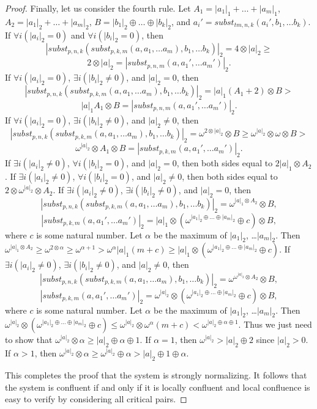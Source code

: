 \documentclass[reqno]{amsart}
\theoremstyle{definition}
\theoremstyle{remark}
\newcommand{\subst}{\mathit{subst}}
\newcommand{\tm}{\mathit{tm}}
\numberwithin{figure}{section}
\begin{document}
\begin{proof}
Finally, let us consider the fourth rule.
Let $A_1 = |a_1|_1 + \ldots + |a_m|_1$, $A_2 = |a_1|_2 + \ldots + |a_m|_2$, $B = |b_1|_2 \oplus \ldots \oplus |b_k|_2$, and $a_i' = \subst_{\tm,n,k}(a_i', b_1, \ldots b_k)$.
If $\forall i (|a_i|_2 = 0)$ and $\forall i (|b_i|_2 = 0)$, then
\[ |\subst_{p,n,k}(\subst_{p,k,m}(a, a_1, \ldots a_m), b_1, \ldots b_k)|_2 = 4 \otimes |a|_2 \geq \]
\[ 2 \otimes |a|_2 = |\subst_{p,n,m}(a, a_1', \ldots a_m')|_2. \]
If $\forall i (|a_i|_2 = 0)$, $\exists i (|b_i|_2 \neq 0)$, and $|a|_2 = 0$, then
\[ |\subst_{p,n,k}(\subst_{p,k,m}(a, a_1, \ldots a_m), b_1, \ldots b_k)|_2 = |a|_1 (A_1 + 2) \otimes B > \]
\[ |a|_1 A_1 \otimes B = |\subst_{p,n,m}(a, a_1', \ldots a_m')|_2. \]
If $\forall i (|a_i|_2 = 0)$, $\exists i (|b_i|_2 \neq 0)$, and $|a|_2 \neq 0$, then
\[ |\subst_{p,n,k}(\subst_{p,k,m}(a, a_1, \ldots a_m), b_1, \ldots b_k)|_2 = \omega^{2 \otimes |a|_2} \otimes B \geq \omega^{|a|_2} \otimes \omega \otimes B >  \]
\[ \omega^{|a|_2} \otimes A_1 \otimes B = |\subst_{p,k,m}(a, a_1', \ldots a_m')|_2. \]
If $\exists i (|a_i|_2 \neq 0)$, $\forall i (|b_i|_2 = 0)$, and $|a|_2 = 0$, then both sides equal to $2 |a|_1 \otimes A_2$.
If $\exists i (|a_i|_2 \neq 0)$, $\forall i (|b_i|_2 = 0)$, and $|a|_2 \neq 0$, then both sides equal to $2 \otimes \omega^{|a|_2} \otimes A_2$.
If $\exists i (|a_i|_2 \neq 0)$, $\exists i (|b_i|_2 \neq 0)$, and $|a|_2 = 0$, then
\[ |\subst_{p,n,k}(\subst_{p,k,m}(a, a_1, \ldots a_m), b_1, \ldots b_k)|_2 = \omega^{|a|_1 \otimes A_2} \otimes B, \]
\[ |\subst_{p,k,m}(a, a_1', \ldots a_m')|_2 = |a|_1 \otimes (\omega^{|a_1|_2 \oplus \ldots \oplus |a_m|_2} \oplus c) \otimes B, \]
where $c$ is some natural number.
Let $\alpha$ be the maximum of $|a_1|_2$, \ldots $|a_m|_2$.
Then $\omega^{|a|_1 \otimes A_2} \geq \omega^{2 \otimes \alpha} \geq \omega^{\alpha + 1} > \omega^\alpha |a|_1 (m + c) \geq |a|_1 \otimes (\omega^{|a_1|_2 \oplus \ldots \oplus |a_m|_2} \oplus c)$.
If $\exists i (|a_i|_2 \neq 0)$, $\exists i (|b_i|_2 \neq 0)$, and $|a|_2 \neq 0$, then
\[ |\subst_{p,n,k}(\subst_{p,k,m}(a, a_1, \ldots a_m), b_1, \ldots b_k)|_2 = \omega^{\omega^{|a|_2} \otimes A_2} \otimes B, \]
\[ |\subst_{p,k,m}(a, a_1', \ldots a_m')|_2 = \omega^{|a|_2} \otimes (\omega^{|a_1|_2 \oplus \ldots \oplus |a_m|_2} \oplus c) \otimes B, \]
where $c$ is some natural number.
Let $\alpha$ be the maximum of $|a_1|_2$, \ldots $|a_m|_2$.
Then $\omega^{|a|_2} \otimes (\omega^{|a_1|_2 \oplus \ldots \oplus |a_m|_2} \oplus c) \leq \omega^{|a|_2} \otimes \omega^\alpha (m + c) < \omega^{|a|_2 \oplus \alpha \oplus 1}$.
Thus we just need to show that $\omega^{|a|_2} \otimes \alpha \geq |a|_2 \oplus \alpha \oplus 1$.
If $\alpha = 1$, then $\omega^{|a|_2} > |a|_2 \oplus 2$ since $|a|_2 > 0$.
If $\alpha > 1$, then $\omega^{|a|_2} \otimes \alpha \geq \omega^{|a|_2} \oplus \alpha > |a|_2 \oplus 1 \oplus \alpha$.

This completes the proof that the system is strongly normalizing.
It follows that the system is confluent if and only if it is locally confluent and local confluence is easy to verify by considering all critical pairs.
\end{proof}
\end{document}
